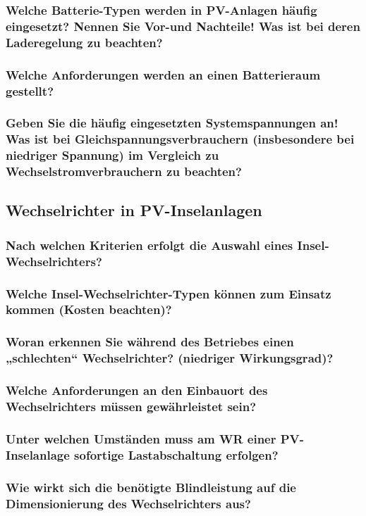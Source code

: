\subsubsection{Welche Batterie-Typen werden in PV-Anlagen häufig eingesetzt? Nennen Sie Vor-und Nachteile! Was ist bei deren Laderegelung zu beachten?}
\subsubsection{Welche Anforderungen werden an einen Batterieraum gestellt?}
\subsubsection{Geben Sie die häufig eingesetzten Systemspannungen an! Was ist bei Gleichspannungsverbrauchern (insbesondere bei niedriger Spannung) im Vergleich zu Wechselstromverbrauchern zu beachten?}

\subsection{Wechselrichter in PV-Inselanlagen}
\subsubsection{Nach welchen Kriterien erfolgt die Auswahl eines Insel-Wechselrichters?}
\subsubsection{Welche Insel-Wechselrichter-Typen können zum Einsatz kommen (Kosten beachten)?}
\subsubsection{Woran erkennen Sie während des Betriebes einen „schlechten“ Wechselrichter? (niedriger Wirkungsgrad)?}
\subsubsection{Welche Anforderungen an den Einbauort des Wechselrichters müssen gewährleistet sein?}
\subsubsection{Unter welchen Umständen muss am WR einer PV-Inselanlage sofortige Lastabschaltung erfolgen?}
\subsubsection{Wie wirkt sich die benötigte Blindleistung auf die Dimensionierung des Wechselrichters aus?}
